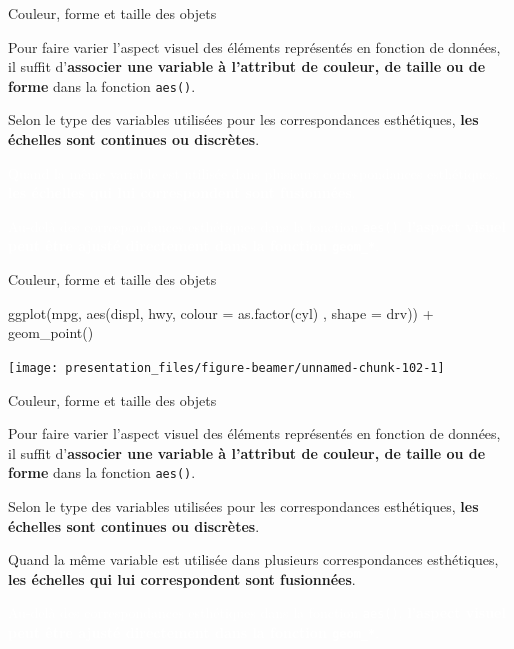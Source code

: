 \documentclass[12pt,handout,ignorenonframetext,]{beamer}
\newenvironment{Shaded}{}{}
\newcommand{\KeywordTok}[1]{\textcolor[rgb]{0.00,0.00,1.00}{{#1}}}
\newcommand{\DataTypeTok}[1]{{#1}}
\newcommand{\StringTok}[1]{\textcolor[rgb]{0.00,0.50,0.50}{{#1}}}
\newcommand{\NormalTok}[1]{{#1}}
\renewenvironment{Shaded}{\begin{snugshade}}{\end{snugshade}}
\begin{document}
\begin{frame}{Couleur, forme et taille des objets}

Pour faire varier l'aspect visuel des éléments représentés en fonction
de données, il suffit
d'\textbf{associer une variable à l'attribut de couleur, de taille ou de forme}
dans la fonction \texttt{aes()}.

Selon le type des variables utilisées pour les correspondances
esthétiques, \textbf{les échelles sont continues ou discrètes}.

\textcolor{white}{Quand la même variable est utilisée dans plusieurs correspondances esthétiques, \textbf{les échelles qui lui correspondent sont fusionnées}.}

\textcolor{white}{Au-delà des correspondances esthétiques dans la fonction \texttt{aes()}, \textbf{l'aspect visuel peut être ajusté directement dans la fonction \texttt{geom\_*}}.}

\end{frame}

\begin{frame}[fragile]{Couleur, forme et taille des objets}

\footnotesize \center

\begin{Shaded}
\begin{Highlighting}[]
\KeywordTok{ggplot}\NormalTok{(mpg, }\KeywordTok{aes}\NormalTok{(displ, hwy, }\DataTypeTok{colour =} \KeywordTok{as.factor}\NormalTok{(cyl)}
  \NormalTok{, }\DataTypeTok{shape =} \NormalTok{drv)) +}
\StringTok{  }\KeywordTok{geom_point}\NormalTok{()}
\end{Highlighting}
\end{Shaded}

\texttt{[image: presentation\_files/figure-beamer/unnamed-chunk-102-1]}

\end{frame}

\begin{frame}{Couleur, forme et taille des objets}

Pour faire varier l'aspect visuel des éléments représentés en fonction
de données, il suffit
d'\textbf{associer une variable à l'attribut de couleur, de taille ou de forme}
dans la fonction \texttt{aes()}.

Selon le type des variables utilisées pour les correspondances
esthétiques, \textbf{les échelles sont continues ou discrètes}.

Quand la même variable est utilisée dans plusieurs correspondances
esthétiques,
\textbf{les échelles qui lui correspondent sont fusionnées}.

\textcolor{white}{Au-delà des correspondances esthétiques dans la fonction \texttt{aes()}, \textbf{l'aspect visuel peut être ajusté directement dans la fonction \texttt{geom\_*}}.}

\end{frame}
\end{document}

